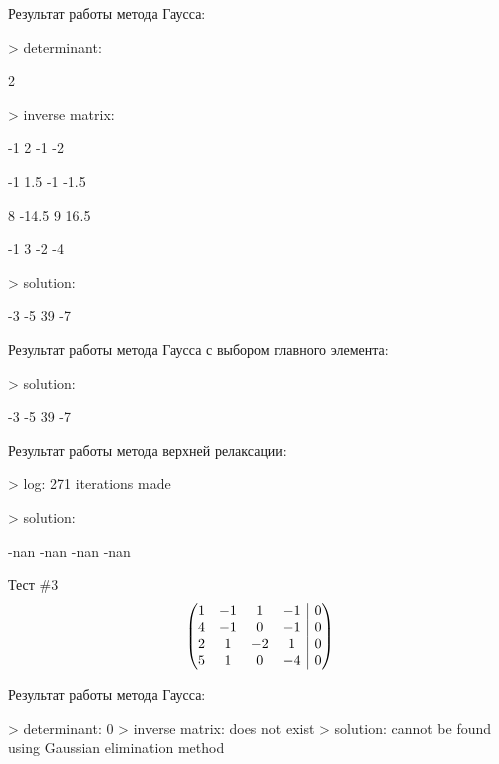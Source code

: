 \documentclass[12pt, a4paper]{report}
\makeatletter
\newenvironment{amatrix}[1]{%
        \left(\begin{array}{@{}*{#1}{c}|c@{}}
}{%
        \end{array}\right)
}
\makeatother
\begin{document}
{\normalsize{Результат работы метода Гаусса: \par}
\normalsize{> determinant: \par
            2 \par
            > inverse matrix: \par
                        -1               2              -1              -2 \par
                        -1             1.5              -1            -1.5 \par
                         8           -14.5               9            16.5 \par
                        -1               3              -2              -4 \par
            > solution: \par
                        -3              -5              39              -7 \par
            }

\vspace{0.25cm}
\normalsize{Результат работы метода Гаусса с выбором главного элемента: \par}
\normalsize{> solution: \par
            -3              -5            39             -7 \par}
\vspace{0.25cm}
\normalsize{Результат работы метода верхней релаксации: \par}
\normalsize{> log: 271 iterations made \par
            > solution: \par
            -nan              -nan            -nan             -nan \par}
\vspace{1cm}

\large{Тест \#3}
\[\begin{amatrix}{4}
        1 & -1 &  1 & -1 & 0 \\
        4 & -1 &  0 & -1 & 0 \\
        2 &  1 & -2 &  1 & 0 \\
        5 &  1 &  0 & -4 & 0 \\
\end{amatrix}\]

\normalsize{Результат работы метода Гаусса: \par}
\normalsize{> determinant:
            0
            > inverse matrix:
            does not exist
            > solution:
            cannot be found using Gaussian elimination method}
\vspace{1cm}

}
\end{document}
